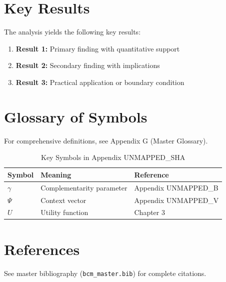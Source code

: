 \section{Key Results}
\label{sec:sha-results}

The analysis yields the following key results:

\begin{enumerate}
    \item \textbf{Result 1:} Primary finding with quantitative support
    \item \textbf{Result 2:} Secondary finding with implications
    \item \textbf{Result 3:} Practical application or boundary condition
\end{enumerate}

\section{Glossary of Symbols}
\label{sec:sha-glossary}

For comprehensive definitions, see Appendix G (Master Glossary).

\begin{table}[htbp]
\centering
\caption{Key Symbols in Appendix UNMAPPED_SHA}
\begin{tabular}{lll}
\toprule
\textbf{Symbol} & \textbf{Meaning} & \textbf{Reference} \\
\midrule
$\gamma$ & Complementarity parameter & Appendix UNMAPPED_B \\
$\Psi$ & Context vector & Appendix UNMAPPED_V \\
$U$ & Utility function & Chapter 3 \\
\bottomrule
\end{tabular}
\end{table}


\section{References}
\label{sec:sha-references}

See master bibliography (\texttt{bcm\_master.bib}) for complete citations.

\nocite{bcm_master}

